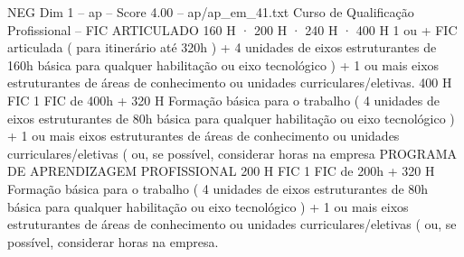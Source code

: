 \begin{textsample}{NEG Dim 1 – ap – Score 4.00 – ap/ap\_em\_41.txt}
Curso de Qualificação Profissional – FIC ARTICULADO 160 H · 200 H · 240 H · 400 H 1 ou + FIC articulada ( para itinerário até 320h ) + 4 unidades de eixos estruturantes de 160h básica para qualquer habilitação ou eixo tecnológico ) + 1 ou mais eixos estruturantes de áreas de conhecimento ou unidades curriculares/eletivas. 400 H FIC 1 FIC de 400h + 320 H Formação básica para o trabalho ( 4 unidades de eixos estruturantes de 80h básica para qualquer habilitação ou eixo tecnológico ) + 1 ou mais eixos estruturantes de áreas de conhecimento ou unidades curriculares/eletivas ( ou, se possível, considerar horas na empresa PROGRAMA DE APRENDIZAGEM PROFISSIONAL 200 H FIC 1 FIC de 200h + 320 H Formação básica para o trabalho ( 4 unidades de eixos estruturantes de 80h básica para qualquer habilitação ou eixo tecnológico ) + 1 ou mais eixos estruturantes de áreas de conhecimento ou unidades curriculares/eletivas ( ou, se possível, considerar horas na empresa.

\end{textsample}
